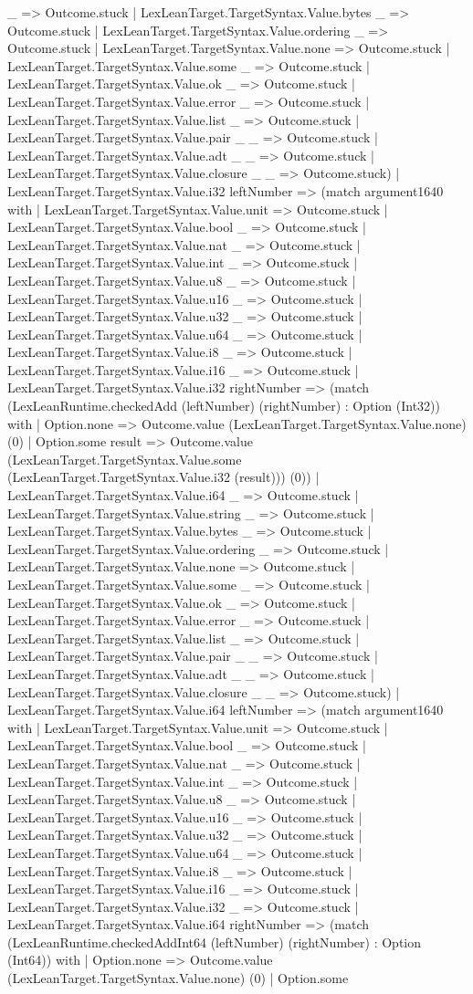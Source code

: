 \documentclass[11pt]{article}
\begin{document}
\_ => Outcome.stuck | LexLeanTarget.TargetSyntax.Value.bytes \_ => Outcome.stuck | LexLeanTarget.TargetSyntax.Value.ordering \_ => Outcome.stuck | LexLeanTarget.TargetSyntax.Value.none => Outcome.stuck | LexLeanTarget.TargetSyntax.Value.some \_ => Outcome.stuck | LexLeanTarget.TargetSyntax.Value.ok \_ => Outcome.stuck | LexLeanTarget.TargetSyntax.Value.error \_ => Outcome.stuck | LexLeanTarget.TargetSyntax.Value.list \_ => Outcome.stuck | LexLeanTarget.TargetSyntax.Value.pair \_ \_ => Outcome.stuck | LexLeanTarget.TargetSyntax.Value.adt \_ \_ => Outcome.stuck | LexLeanTarget.TargetSyntax.Value.closure \_ \_ => Outcome.stuck) | LexLeanTarget.TargetSyntax.Value.i32 leftNumber => (match argument1640 with | LexLeanTarget.TargetSyntax.Value.unit => Outcome.stuck | LexLeanTarget.TargetSyntax.Value.bool \_ => Outcome.stuck | LexLeanTarget.TargetSyntax.Value.nat \_ => Outcome.stuck | LexLeanTarget.TargetSyntax.Value.int \_ => Outcome.stuck | LexLeanTarget.TargetSyntax.Value.u8 \_ => Outcome.stuck | LexLeanTarget.TargetSyntax.Value.u16 \_ => Outcome.stuck | LexLeanTarget.TargetSyntax.Value.u32 \_ => Outcome.stuck | LexLeanTarget.TargetSyntax.Value.u64 \_ => Outcome.stuck | LexLeanTarget.TargetSyntax.Value.i8 \_ => Outcome.stuck | LexLeanTarget.TargetSyntax.Value.i16 \_ => Outcome.stuck | LexLeanTarget.TargetSyntax.Value.i32 rightNumber => (match (LexLeanRuntime.checkedAdd (leftNumber) (rightNumber) : Option (Int32)) with | Option.none => Outcome.value (LexLeanTarget.TargetSyntax.Value.none) (0) | Option.some result => Outcome.value (LexLeanTarget.TargetSyntax.Value.some (LexLeanTarget.TargetSyntax.Value.i32 (result))) (0)) | LexLeanTarget.TargetSyntax.Value.i64 \_ => Outcome.stuck | LexLeanTarget.TargetSyntax.Value.string \_ => Outcome.stuck | LexLeanTarget.TargetSyntax.Value.bytes \_ => Outcome.stuck | LexLeanTarget.TargetSyntax.Value.ordering \_ => Outcome.stuck | LexLeanTarget.TargetSyntax.Value.none => Outcome.stuck | LexLeanTarget.TargetSyntax.Value.some \_ => Outcome.stuck | LexLeanTarget.TargetSyntax.Value.ok \_ => Outcome.stuck | LexLeanTarget.TargetSyntax.Value.error \_ => Outcome.stuck | LexLeanTarget.TargetSyntax.Value.list \_ => Outcome.stuck | LexLeanTarget.TargetSyntax.Value.pair \_ \_ => Outcome.stuck | LexLeanTarget.TargetSyntax.Value.adt \_ \_ => Outcome.stuck | LexLeanTarget.TargetSyntax.Value.closure \_ \_ => Outcome.stuck) | LexLeanTarget.TargetSyntax.Value.i64 leftNumber => (match argument1640 with | LexLeanTarget.TargetSyntax.Value.unit => Outcome.stuck | LexLeanTarget.TargetSyntax.Value.bool \_ => Outcome.stuck | LexLeanTarget.TargetSyntax.Value.nat \_ => Outcome.stuck | LexLeanTarget.TargetSyntax.Value.int \_ => Outcome.stuck | LexLeanTarget.TargetSyntax.Value.u8 \_ => Outcome.stuck | LexLeanTarget.TargetSyntax.Value.u16 \_ => Outcome.stuck | LexLeanTarget.TargetSyntax.Value.u32 \_ => Outcome.stuck | LexLeanTarget.TargetSyntax.Value.u64 \_ => Outcome.stuck | LexLeanTarget.TargetSyntax.Value.i8 \_ => Outcome.stuck | LexLeanTarget.TargetSyntax.Value.i16 \_ => Outcome.stuck | LexLeanTarget.TargetSyntax.Value.i32 \_ => Outcome.stuck | LexLeanTarget.TargetSyntax.Value.i64 rightNumber => (match (LexLeanRuntime.checkedAddInt64 (leftNumber) (rightNumber) : Option (Int64)) with | Option.none => Outcome.value (LexLeanTarget.TargetSyntax.Value.none) (0) | Option.some 
\end{document}
